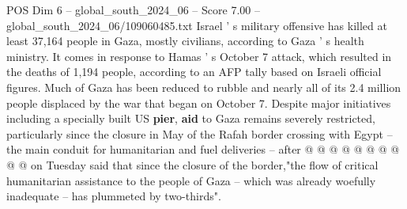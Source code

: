 \begin{textsample}{POS Dim 6 – global\_south\_2024\_06 – Score 7.00 – global\_south\_2024\_06/109060485.txt}
Israel ' s military offensive has killed at least 37,164 people in Gaza, mostly civilians, according to Gaza ' s health ministry.
It comes in response to Hamas ' s October 7 attack, which resulted in the deaths of 1,194 people, according to an AFP tally based on Israeli official figures.
Much of Gaza has been reduced to rubble and nearly all of its 2.4 million people displaced by the war that began on October 7.
Despite major initiatives including a specially built US \textbf{pier}, \textbf{aid} to Gaza remains severely restricted, particularly since the closure in May of the Rafah border crossing with Egypt -- the main conduit for humanitarian and fuel deliveries -- after @ @ @ @ @ @ @ @ @ @ on Tuesday said that since the closure of the border,"the flow of critical humanitarian assistance to the people of Gaza -- which was already woefully inadequate -- has plummeted by two-thirds".

\end{textsample}
